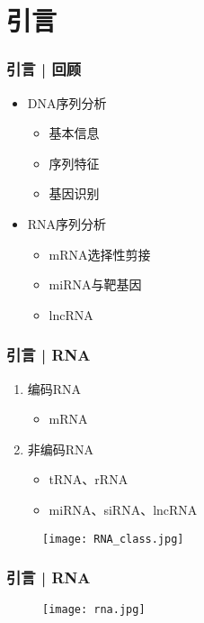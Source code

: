 \section{引言}
\begin{frame}
  \frametitle{引言 | 回顾}
  \begin{itemize}[<+-|alert@+>]
    \item DNA序列分析
      \begin{itemize}
        \item 基本信息
        \item 序列特征
        \item 基因识别
      \end{itemize}
    \item RNA序列分析
      \begin{itemize}
        \item mRNA选择性剪接
        \item miRNA与靶基因
        \item lncRNA
      \end{itemize}
  \end{itemize}
\end{frame}

\begin{frame}
  \frametitle{引言 | RNA}
  \begin{enumerate}
    \item 编码RNA
      \begin{itemize}
        \item mRNA
      \end{itemize}
    \item 非编码RNA
      \begin{itemize}
        \item tRNA、rRNA
        \item miRNA、siRNA、lncRNA
      \end{itemize}
  \end{enumerate}
  \begin{figure}
    \centering
    \texttt{[image: RNA\_class.jpg]}
  \end{figure}
\end{frame}

\begin{frame}
  \frametitle{引言 | RNA}
  \begin{figure}
    \centering
    \texttt{[image: rna.jpg]}
  \end{figure}
\end{frame}

